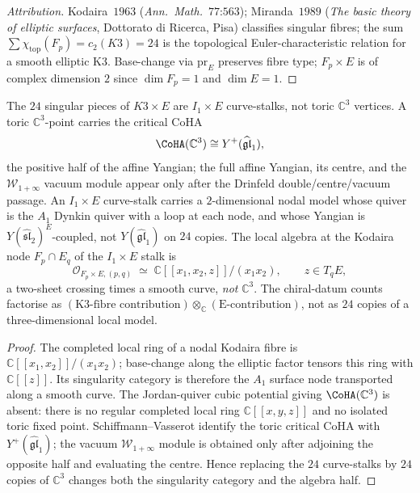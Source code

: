 \begin{proof}[Attribution]
Kodaira~$1963$ (\emph{Ann.\ Math.}~$77$:$563$); Miranda~$1989$ (\emph{The basic theory of elliptic surfaces}, Dottorato di Ricerca, Pisa) classifies singular fibres; the sum $\sum \chi_{\mathrm{top}}(F_p) = c_2(K3) = 24$ is the topological Euler-characteristic relation for a smooth elliptic K3. Base-change via $\mathrm{pr}_E$ preserves fibre type; $F_p \times E$ is of complex dimension $2$ since $\dim F_p = 1$ and $\dim E = 1$.
\end{proof}

\begin{proposition}
\label{prop:curve-stalk-positive-half-firewall}
The $24$ singular pieces of $K3\times E$ are $I_1\times E$ curve-stalks, not toric $\mathbb C^3$ vertices. A toric $\mathbb{C}^3$-point carries the critical CoHA
\[
 \CoHA(\mathbb C^3)\cong Y^+(\widehat{\mathfrak{gl}}_1),
\]
the positive half of the affine Yangian; the full affine Yangian, its centre, and the $\mathcal W_{1+\infty}$ vacuum module appear only after the Drinfeld double/centre/vacuum passage. An $I_1 \times E$ curve-stalk carries a $2$-dimensional nodal model whose quiver is the $A_1$ Dynkin quiver with a loop at each node, and whose Yangian is $Y(\widehat{\mathfrak{sl}}_2)^E$-coupled, not $Y(\widehat{\mathfrak{gl}}_1)$ on $24$ copies. The local algebra at the Kodaira node $F_p \cap E_q$ of the $I_1 \times E$ stalk is
\[
 \mathcal{O}_{F_p \times E, (p, q)} \;\simeq\; \mathbb{C}[[x_1, x_2, z]]/(x_1 x_2), \qquad z \in T_q E,
\]
a two-sheet crossing times a smooth curve, \emph{not} $\mathbb{C}^3$. The chiral-datum counts factorise as $(\text{K3-fibre contribution}) \otimes_{\mathbb{C}} (\text{E-contribution})$, not as $24$ copies of a three-dimensional local model.
\end{proposition}

\begin{proof}
The completed local ring of a nodal Kodaira fibre is $\mathbb C[[x_1,x_2]]/(x_1x_2)$; base-change along the elliptic factor tensors this ring with $\mathbb C[[z]]$. Its singularity category is therefore the $A_1$ surface node transported along a smooth curve. The Jordan-quiver cubic potential giving $\CoHA(\mathbb C^3)$ is absent: there is no regular completed local ring $\mathbb C[[x,y,z]]$ and no isolated toric fixed point. Schiffmann--Vasserot identify the toric critical CoHA with $Y^+(\widehat{\mathfrak{gl}}_1)$; the vacuum $\mathcal W_{1+\infty}$ module is obtained only after adjoining the opposite half and evaluating the centre. Hence replacing the $24$ curve-stalks by $24$ copies of $\mathbb C^3$ changes both the singularity category and the algebra half.
\end{proof}


